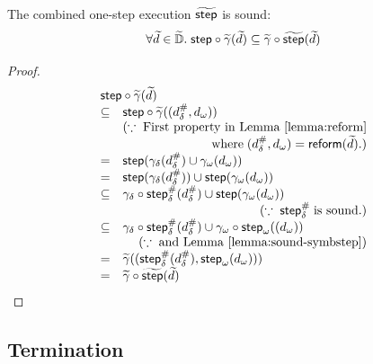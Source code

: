 \begin{lemma}\label{lemma:sound-combstep}
  The combined one-step execution $\widetilde{\textsf{step}}$ is sound:
  \[
    \forall \widetilde{d} \in \widetilde{\mathbb{D}}. \; \textsf{step} \circ \widetilde{\gamma}(\widetilde{d}) \subseteq
    \widetilde{\gamma} \circ \widetilde{\textsf{step}}(\widetilde{d})\\
  \]
\end{lemma}
\begin{proof}
  \[
    \begin{array}{cl}
      \multicolumn{2}{l}{
        \step \circ \combgamma(\combelem)
      }\\
      \subseteq& \step \circ \combgamma((\sabselem, \symbelem))\\
       & \multicolumn{1}{r}{(\because \; \text{First property in
       Lemma~\ref{lemma:reform}}}\\
       & \multicolumn{1}{r}{\text{where} \; (\sabselem, \symbelem)
       = \reform(\combelem).)}\\

      =& \step(\sgamma(\sabselem) \cup \symbgamma(\symbelem))\\
      =& \step(\sgamma(\sabselem)) \cup \step(\symbgamma(\symbelem))\\
      \subseteq& \sgamma \circ \sabsstep(\sabselem) \cup \step(\symbgamma(\symbelem))\\
      & \multicolumn{1}{r}{(\because \; \sabsstep \; \text{is sound.})}\\
      \subseteq& \sgamma \circ \sabsstep(\sabselem) \cup \symbgamma \circ
      \symbstep((\symbelem))\\
               & \multicolumn{1}{r}{(\because \; \text{and
               Lemma~\ref{lemma:sound-symbstep}})}\\
      =& \combgamma((\sabsstep(\sabselem), \symbstep(\symbelem)))\\
      =& \combgamma \circ \combstep(\combelem)\\
    \end{array}
  \]
\end{proof}


\subsection{Termination}

